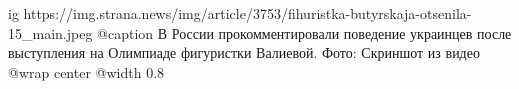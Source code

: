  
 
 
 
 

\ifcmt
  ig https://img.strana.news/img/article/3753/fihuristka-butyrskaja-otsenila-15_main.jpeg
  @caption В России прокомментировали поведение украинцев после выступления на Олимпиаде фигуристки Валиевой. Фото: Скриншот из видео
  @wrap center
  @width 0.8
\fi
